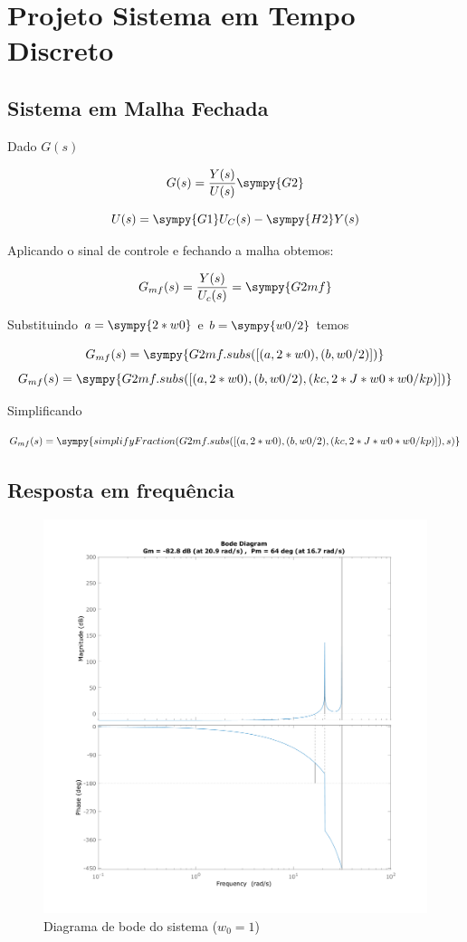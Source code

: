 \documentclass[a4paper,11pt]{article}
\begin{document}
\section{Projeto Sistema em Tempo Discreto}

\subsection{Sistema em Malha Fechada}

Dado $G(s)$

\begin{equation}
    G(s) = \frac{Y(s)}{U(s)} \sympy{G2}
\end{equation}

\begin{equation}
    U(s) = \sympy{G1}U_C(s) - \sympy{H2}Y(s)
\end{equation}

Aplicando o sinal de controle e fechando a malha obtemos:

$$G_{mf}(s) = \frac{Y(s)}{U_c(s)} = \sympy{G2mf}$$

Substituindo $a = \sympy{2*w0}$ e $b = \sympy{w0/2}$ temos

$$
G_{mf}(s) = \sympy{G2mf.subs([(a,2*w0),(b,w0/2)])}
$$
$$
G_{mf}(s) = \sympy{G2mf.subs([(a,2*w0),(b,w0/2),(kc,2*J*w0*w0/kp)])}
$$

Simplificando

\begin{equation}
    G_{mf}(s) = \sympy{simplifyFraction(G2mf.subs([(a,2*w0),(b,w0/2),(kc,2*J*w0*w0/kp)]),s)}
\end{equation}

\subsection{Resposta em frequência}

\begin{figure}[H]
    \centering
    \includegraphics[width=0.9\linewidth]{img/exsim2-plot-bode2.png}
    \caption{Diagrama de bode do sistema ($w_0=1$)}
\end{figure}
\end{document}
